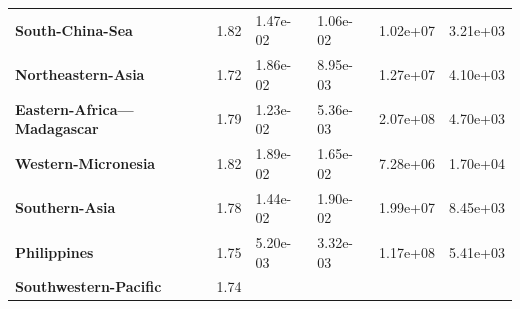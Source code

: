 \begin{table}[H]
{\begin{tabular}{llllll}
            \textbf{South-China-Sea}                            & 1.82
                                                                & 1.47e-02
                                                                & 1.06e-02
                                                                & 1.02e+07
                                                                & 3.21e+03
            \\
            \textbf{Northeastern-Asia}                          & 1.72
                                                                & 1.86e-02
                                                                & 8.95e-03
                                                                & 1.27e+07
                                                                & 4.10e+03
            \\
            \textbf{Eastern-Africa---Madagascar}                & 1.79
                                                                & 1.23e-02
                                                                & 5.36e-03
                                                                & 2.07e+08
                                                                & 4.70e+03
            \\
            \textbf{Western-Micronesia}                         & 1.82
                                                                & 1.89e-02
                                                                & 1.65e-02
                                                                & 7.28e+06
                                                                & 1.70e+04
            \\
            \textbf{Southern-Asia}                              & 1.78
                                                                & 1.44e-02
                                                                & 1.90e-02
                                                                & 1.99e+07
                                                                & 8.45e+03
            \\
            \textbf{Philippines}                                & 1.75
                                                                & 5.20e-03
                                                                & 3.32e-03
                                                                & 1.17e+08
                                                                & 5.41e+03
            \\
            \textbf{Southwestern-Pacific}                       & 1.74

\end{tabular}}
\end{table}
